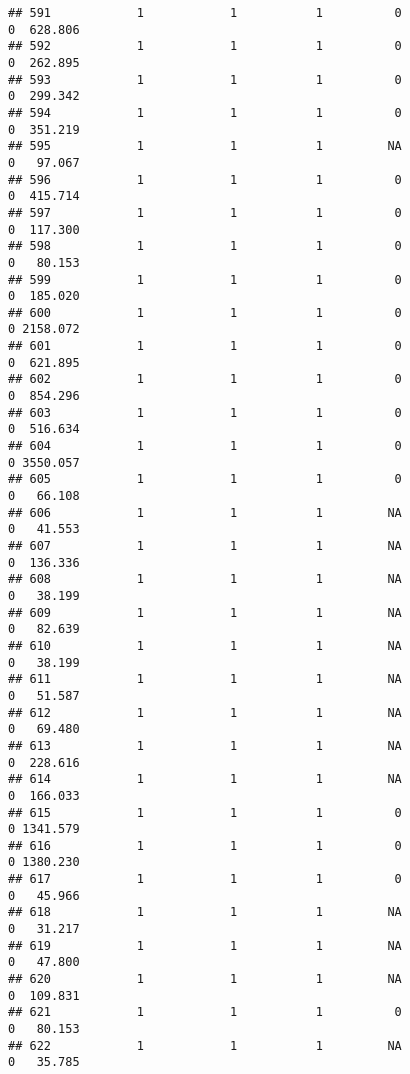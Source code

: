 \documentclass[
]{article}
\begin{document}
\begin{verbatim}
## 591            1            1           1          0                0  628.806
## 592            1            1           1          0                0  262.895
## 593            1            1           1          0                0  299.342
## 594            1            1           1          0                0  351.219
## 595            1            1           1         NA                0   97.067
## 596            1            1           1          0                0  415.714
## 597            1            1           1          0                0  117.300
## 598            1            1           1          0                0   80.153
## 599            1            1           1          0                0  185.020
## 600            1            1           1          0                0 2158.072
## 601            1            1           1          0                0  621.895
## 602            1            1           1          0                0  854.296
## 603            1            1           1          0                0  516.634
## 604            1            1           1          0                0 3550.057
## 605            1            1           1          0                0   66.108
## 606            1            1           1         NA                0   41.553
## 607            1            1           1         NA                0  136.336
## 608            1            1           1         NA                0   38.199
## 609            1            1           1         NA                0   82.639
## 610            1            1           1         NA                0   38.199
## 611            1            1           1         NA                0   51.587
## 612            1            1           1         NA                0   69.480
## 613            1            1           1         NA                0  228.616
## 614            1            1           1         NA                0  166.033
## 615            1            1           1          0                0 1341.579
## 616            1            1           1          0                0 1380.230
## 617            1            1           1          0                0   45.966
## 618            1            1           1         NA                0   31.217
## 619            1            1           1         NA                0   47.800
## 620            1            1           1         NA                0  109.831
## 621            1            1           1          0                0   80.153
## 622            1            1           1         NA                0   35.785

\end{verbatim}
\end{document}
